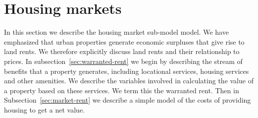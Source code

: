 








\section{Housing markets} \label{section-rent}
In this section we describe the housing market sub-model model. %
We have emphasized that urban properties generate economic surpluses that give rise to land rents. We therefore explicitly discuss land rents and their relationship to prices. In subsection~\ref{sec:warranted-rent} we begin by describing the stream of benefits that a property generates, including locational services, housing services and other amenities.  We describe the variables involved in calculating the value of a property based on these services. We term this the \gls{warranted rent}. Then in Subsection~\ref{sec:market-rent} we describe a simple model of the costs of providing housing to get a net value. 

